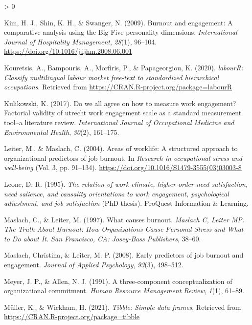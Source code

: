 \documentclass[
  english,
  man]{apa6}
\newlength{\cslhangindent}
\newenvironment{CSLReferences}[2] %
 {%
  \setlength{\parindent}{0pt}
  \ifodd #1 \everypar{\setlength{\hangindent}{\cslhangindent}}\ignorespaces\fi
  \ifnum #2 > 0
  \setlength{\parskip}{#2\baselineskip}
  \fi
 }%
 {}
\begin{document}
\begin{CSLReferences}{1}{0}
\leavevmode\hypertarget{ref-kim_burnout_2009}{}%
Kim, H. J., Shin, K. H., \& Swanger, N. (2009). Burnout and engagement: {A} comparative analysis using the {Big} {Five} personality dimensions. \emph{International Journal of Hospitality Management}, \emph{28}(1), 96--104. \url{https://doi.org/10.1016/j.ijhm.2008.06.001}

\leavevmode\hypertarget{ref-R-labourR}{}%
Kouretsis, A., Bampouris, A., Morfiris, P., \& Papageorgiou, K. (2020). \emph{labourR: Classify multilingual labour market free-text to standardized hierarchical occupations}. Retrieved from \url{https://CRAN.R-project.org/package=labourR}

\leavevmode\hypertarget{ref-kulikowski2017we}{}%
Kulikowski, K. (2017). Do we all agree on how to measure work engagement? Factorial validity of utrecht work engagement scale as a standard measurement tool--a literature review. \emph{International Journal of Occupational Medicine and Environmental Health}, \emph{30}(2), 161--175.

\leavevmode\hypertarget{ref-leiter_areas_2004}{}%
Leiter, M., \& Maslach, C. (2004). Areas of worklife: A structured approach to organizational predictors of job burnout. In \emph{Research in occupational stress and well-being} (Vol. 3, pp. 91--134). \url{https://doi.org/10.1016/S1479-3555(03)03003-8}

\leavevmode\hypertarget{ref-leone_relation_1995}{}%
Leone, D. R. (1995). \emph{The relation of work climate, higher order need satisfaction, need salience, and causality orientations to work engagement, psychological adjustment, and job satisfaction} (PhD thesis). ProQuest Information \& Learning.

\leavevmode\hypertarget{ref-maslach1997causes}{}%
Maslach, C., \& Leiter, M. (1997). What causes burnout. \emph{Maslach C, Leiter MP. The Truth About Burnout: How Organizations Cause Personal Stress and What to Do about It. San Francisco, CA: Josey-Bass Publishers}, 38--60.

\leavevmode\hypertarget{ref-maslach_early_2008}{}%
Maslach, Christina, \& Leiter, M. P. (2008). Early predictors of job burnout and engagement. \emph{Journal of Applied Psychology}, \emph{93}(3), 498--512.

\leavevmode\hypertarget{ref-meyer_three-component_1991}{}%
Meyer, J. P., \& Allen, N. J. (1991). A three-component conceptualization of organizational commitment. \emph{Human Resource Management Review}, \emph{1}(1), 61--89.

\leavevmode\hypertarget{ref-R-tibble}{}%
Müller, K., \& Wickham, H. (2021). \emph{Tibble: Simple data frames}. Retrieved from \url{https://CRAN.R-project.org/package=tibble}


\end{CSLReferences}
\end{document}
